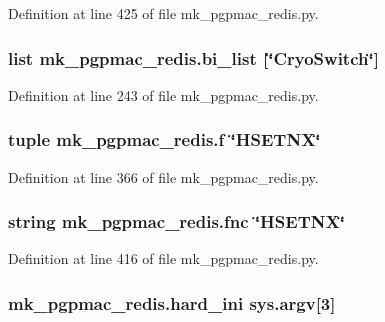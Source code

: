 Definition at line 425 of file mk\-\_\-pgpmac\-\_\-redis.\-py.

\hypertarget{namespacemk__pgpmac__redis_a961bfabfbdcbf5b749f6e6ecdc733619}{
\subsubsection[{bi\-\_\-list}]{\setlength{\rightskip}{0pt plus 5cm}list mk\-\_\-pgpmac\-\_\-redis.\-bi\-\_\-list \mbox{[}\char`\"{}Cryo\-Switch\char`\"{}\mbox{]}}}\label{namespacemk__pgpmac__redis_a961bfabfbdcbf5b749f6e6ecdc733619}


Definition at line 243 of file mk\-\_\-pgpmac\-\_\-redis.\-py.

\hypertarget{namespacemk__pgpmac__redis_a057fe7457503e0de97edcf855591ed58}{
\subsubsection[{f}]{\setlength{\rightskip}{0pt plus 5cm}tuple mk\-\_\-pgpmac\-\_\-redis.\-f \char`\"{}H\-S\-E\-T\-N\-X\char`\"{}}}\label{namespacemk__pgpmac__redis_a057fe7457503e0de97edcf855591ed58}


Definition at line 366 of file mk\-\_\-pgpmac\-\_\-redis.\-py.

\hypertarget{namespacemk__pgpmac__redis_a654b54ba0758b8b84516938260851129}{
\subsubsection[{fnc}]{\setlength{\rightskip}{0pt plus 5cm}string mk\-\_\-pgpmac\-\_\-redis.\-fnc \char`\"{}H\-S\-E\-T\-N\-X\char`\"{}}}\label{namespacemk__pgpmac__redis_a654b54ba0758b8b84516938260851129}


Definition at line 416 of file mk\-\_\-pgpmac\-\_\-redis.\-py.

\hypertarget{namespacemk__pgpmac__redis_a5864d9c27cbe61534756880cbfebe4f1}{
\subsubsection[{hard\-\_\-ini}]{\setlength{\rightskip}{0pt plus 5cm}mk\-\_\-pgpmac\-\_\-redis.\-hard\-\_\-ini sys.\-argv\mbox{[}3\mbox{]}}}\label{namespacemk__pgpmac__redis_a5864d9c27cbe61534756880cbfebe4f1}


